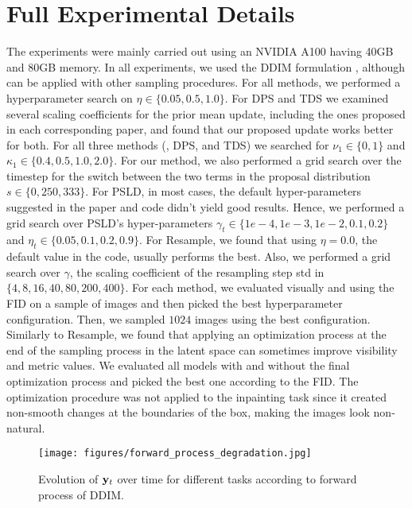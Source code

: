 \appendix

\onecolumn
\section{Full Experimental Details}
\label{sec:full_exp_details}
The experiments were mainly carried out using an NVIDIA A100 having 40GB and 80GB memory. 
In all experiments, we used the DDIM formulation \cite{SongME21}, although \MN{} can be applied with other sampling procedures. For all methods, we performed a hyperparameter search on $\eta \in \{0.05, 0.5, 1.0\}$. For DPS and TDS we examined several scaling coefficients for the prior mean update, including the ones proposed in each corresponding paper, and found that our proposed update works better for both. For all three methods (\MN{}, DPS, and TDS) we searched for $\nu_1 \in \{0, 1\}$ and $\kappa_1 \in \{0.4, 0.5, 1.0, 2.0\}$. For our method, we also performed a grid search over the timestep for the switch between the two terms in the proposal distribution $s \in \{0, 250, 333\}$. For PSLD, in most cases, the default hyper-parameters suggested in the paper and code didn't yield good results. Hence,
we performed a grid search over PSLD's hyper-parameters $\gamma_t \in \{1e-4, 1e-3, 1e-2, 0.1, 0.2\}$ and $\eta_t \in \{0.05, 0.1, 0.2, 0.9\}$. For Resample, we found that using $\eta = 0.0$, the default value in the code, usually performs the best. Also, we performed a grid search over $\gamma$, the scaling coefficient of the resampling step std in $\{4, 8, 16, 40, 80, 200, 400\}$. For each method, we evaluated visually and using the FID on a sample of images and then picked the best hyperparameter configuration. Then, we sampled $1024$ images using the best configuration. Similarly to Resample, we found that applying an optimization process at the end of the sampling process in the latent space can sometimes improve visibility and metric values. We evaluated all models with and without the final optimization process and picked the best one according to the FID. The optimization procedure was not applied to the inpainting task since it created non-smooth changes at the boundaries of the box, making the images look non-natural.

\begin{figure*}[!t]
    \centering
    \texttt{[image: figures/forward\_process\_degradation.jpg]}
\caption{Evolution of ${\mathbf{y}}_t$ over time for different tasks according to forward process of DDIM.}
\label{fig:in_forward_process}
\end{figure*}

